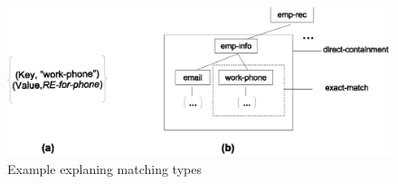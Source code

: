  
 	\begin{figure} [t]
 		\centering
 		\includegraphics[width=1\textwidth]{match-types}
 		\caption{Example explaning matching types}
 		\label{fig:match-types}
 	\end{figure}
 